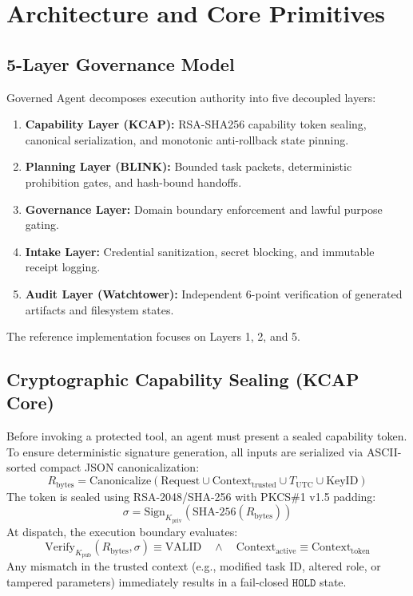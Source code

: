 \documentclass[11pt,a4paper]{article}
\begin{document}
\section{Architecture and Core Primitives}

\subsection{5-Layer Governance Model}
Governed Agent decomposes execution authority into five decoupled layers:
\begin{enumerate}
    \item \textbf{Capability Layer (KCAP):} RSA-SHA256 capability token sealing, canonical serialization, and monotonic anti-rollback state pinning.
    \item \textbf{Planning Layer (BLINK):} Bounded task packets, deterministic prohibition gates, and hash-bound handoffs.
    \item \textbf{Governance Layer:} Domain boundary enforcement and lawful purpose gating.
    \item \textbf{Intake Layer:} Credential sanitization, secret blocking, and immutable receipt logging.
    \item \textbf{Audit Layer (Watchtower):} Independent 6-point verification of generated artifacts and filesystem states.
\end{enumerate}

The reference implementation focuses on Layers 1, 2, and 5.

\subsection{Cryptographic Capability Sealing (KCAP Core)}
Before invoking a protected tool, an agent must present a sealed capability token. To ensure deterministic signature generation, all inputs are serialized via ASCII-sorted compact JSON canonicalization:
\begin{equation}
    R_{\text{bytes}} = \text{Canonicalize}(\text{Request} \cup \text{Context}_{\text{trusted}} \cup T_{\text{UTC}} \cup \text{KeyID})
\end{equation}
The token is sealed using RSA-2048/SHA-256 with PKCS\#1 v1.5 padding:
\begin{equation}
    \sigma = \text{Sign}_{K_{\text{priv}}}(\text{SHA-256}(R_{\text{bytes}}))
\end{equation}
At dispatch, the execution boundary evaluates:
\begin{equation}
    \text{Verify}_{K_{\text{pub}}}(R_{\text{bytes}}, \sigma) \equiv \text{VALID} \quad \land \quad \text{Context}_{\text{active}} \equiv \text{Context}_{\text{token}}
\end{equation}
Any mismatch in the trusted context (e.g., modified task ID, altered role, or tampered parameters) immediately results in a fail-closed $\mathtt{HOLD}$ state.
\end{document}
